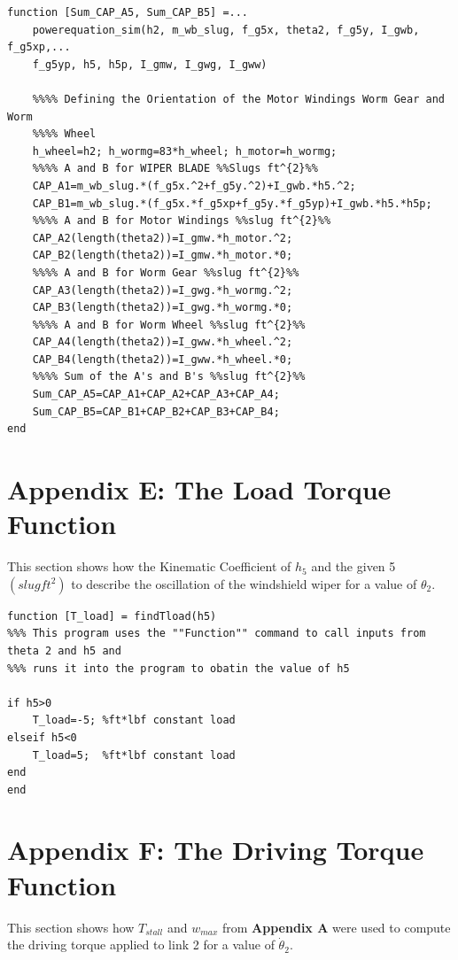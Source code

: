 \documentclass[12pt]{article}
\begin{document}
\begingroup
\fontsize{8pt}{10pt}\selectfont
\begin{verbatim}
function [Sum_CAP_A5, Sum_CAP_B5] =...
    powerequation_sim(h2, m_wb_slug, f_g5x, theta2, f_g5y, I_gwb, f_g5xp,...
    f_g5yp, h5, h5p, I_gmw, I_gwg, I_gww)

    %%%% Defining the Orientation of the Motor Windings Worm Gear and Worm
    %%%% Wheel
    h_wheel=h2; h_wormg=83*h_wheel; h_motor=h_wormg;
    %%%% A and B for WIPER BLADE %%Slugs ft^{2}%%
    CAP_A1=m_wb_slug.*(f_g5x.^2+f_g5y.^2)+I_gwb.*h5.^2;
    CAP_B1=m_wb_slug.*(f_g5x.*f_g5xp+f_g5y.*f_g5yp)+I_gwb.*h5.*h5p;
    %%%% A and B for Motor Windings %%slug ft^{2}%%
    CAP_A2(length(theta2))=I_gmw.*h_motor.^2;
    CAP_B2(length(theta2))=I_gmw.*h_motor.*0;
    %%%% A and B for Worm Gear %%slug ft^{2}%%
    CAP_A3(length(theta2))=I_gwg.*h_wormg.^2;
    CAP_B3(length(theta2))=I_gwg.*h_wormg.*0;
    %%%% A and B for Worm Wheel %%slug ft^{2}%%
    CAP_A4(length(theta2))=I_gww.*h_wheel.^2;
    CAP_B4(length(theta2))=I_gww.*h_wheel.*0;
    %%%% Sum of the A's and B's %%slug ft^{2}%%
    Sum_CAP_A5=CAP_A1+CAP_A2+CAP_A3+CAP_A4;
    Sum_CAP_B5=CAP_B1+CAP_B2+CAP_B3+CAP_B4; 
end
\end{verbatim}
\endgroup

\newpage
\section*{Appendix E: The Load Torque Function}
\begin{doublespace}
This section shows how the Kinematic Coefficient of $h_{5}$ and the given 5 $(slug ft^{2})$ to describe the oscillation of the windshield wiper for a value of $\theta_{2}$.
\end{doublespace}

\begingroup
\fontsize{8pt}{10pt}\selectfont
\begin{verbatim}
function [T_load] = findTload(h5)
%%% This program uses the ""Function"" command to call inputs from theta 2 and h5 and 
%%% runs it into the program to obatin the value of h5

if h5>0
    T_load=-5; %ft*lbf constant load
elseif h5<0
    T_load=5;  %ft*lbf constant load
end
end
\end{verbatim}
\endgroup

\newpage
\section*{Appendix F: The Driving Torque Function}
\begin{doublespace}
This section shows how $T_{stall}$ and $w_{max}$ from {\bf Appendix A} were used to compute the driving torque applied to link 2 for a value of ${{}\dot{\theta}_{2}}$.
\end{doublespace}
\end{document}
